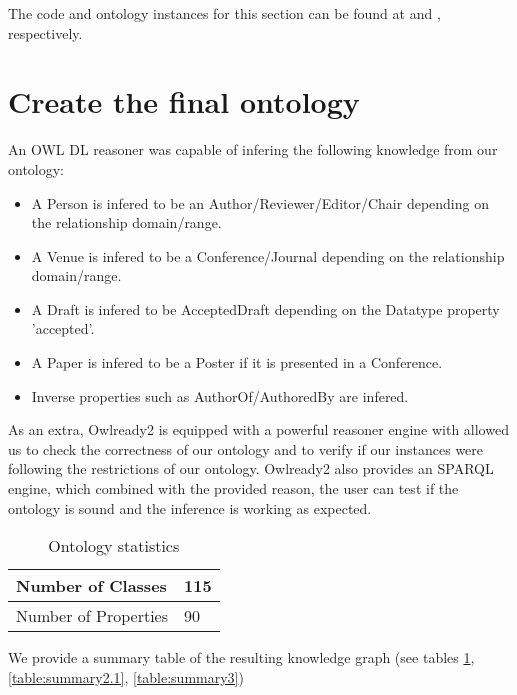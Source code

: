 \documentclass[12pt, a4paper]{article}
\begin{document}
The code and ontology instances for this section can be found at  and , respectively.

\section{Create the final ontology}\label{sec:create}

An OWL DL reasoner was capable of infering the following knowledge from our ontology:

\begin{itemize}
  \item A Person is infered to be an Author/Reviewer/Editor/Chair depending on the relationship domain/range.
  \item A Venue is infered to be a Conference/Journal depending on the relationship domain/range.
  \item A Draft is infered to be AcceptedDraft depending on the Datatype property 'accepted'.
  \item A Paper is infered to be a Poster if it is presented in a Conference.
  \item Inverse properties such as AuthorOf/AuthoredBy are infered.
\end{itemize}

As an extra, Owlready2 is equipped with a powerful reasoner engine with allowed us to check the correctness of our ontology and to verify if our instances were following the restrictions of our ontology. Owlready2 also provides an SPARQL engine, which combined with the provided reason, the user can test if the ontology is sound and the inference is working as expected.

\begin{table}[H]
  \centering
  \begin{tabular}{ll}
    Number of Classes & 115\\
    \hline
    Number of Properties & 90\\
  \end{tabular}
  \caption{Ontology statistics}
  \label{table:summary1}
\end{table}

We provide a summary table of the resulting knowledge graph (see tables \ref{table:summary1}, \ref{table:summary2.1}, \ref{table:summary3})
\end{document}

